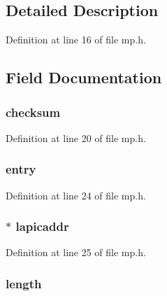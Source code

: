 \subsection{Detailed Description}


Definition at line 16 of file mp.\-h.



\subsection{Field Documentation}
\hypertarget{structmpconf_a282c64bb49f098de8b45dfc535c91ac5}{
\subsubsection[{checksum}]{ checksum}}\label{structmpconf_a282c64bb49f098de8b45dfc535c91ac5}


Definition at line 20 of file mp.\-h.

\hypertarget{structmpconf_a9386724f6cb6fb5065503234c8fcf67f}{
\subsubsection[{entry}]{ entry}}\label{structmpconf_a9386724f6cb6fb5065503234c8fcf67f}


Definition at line 24 of file mp.\-h.

\hypertarget{structmpconf_a4a155d16bc3b1fec01b4ec50b2034005}{
\subsubsection[{lapicaddr}]{$\ast$ lapicaddr}}\label{structmpconf_a4a155d16bc3b1fec01b4ec50b2034005}


Definition at line 25 of file mp.\-h.

\hypertarget{structmpconf_a795f4a78591a76d2ee53790ded8bff1f}{
\subsubsection[{length}]{ length}}\label{structmpconf_a795f4a78591a76d2ee53790ded8bff1f}


